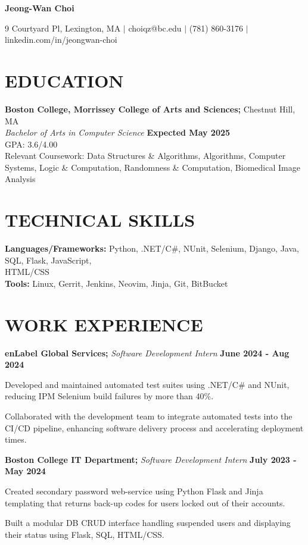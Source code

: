 \documentclass[11pt]{article}
\begin{document}
\begin{center}
\textbf{\LARGE Jeong-Wan Choi}
\end{center}

\begin{center}
9 Courtyard Pl, Lexington, MA $|$ choiqz@bc.edu $|$ (781) 860-3176 $|$ linkedin.com/in/jeongwan-choi 
\end{center}

\section*{EDUCATION}
\textbf{Boston College, Morrissey College of Arts and Sciences;} Chestnut Hill, MA \\
\textit{Bachelor of Arts in Computer Science} \hfill \textbf{Expected May 2025} \\
GPA: 3.6/4.00 \\
Relevant Coursework: Data Structures \& Algorithms, Algorithms, Computer Systems, Logic \& Computation, Randomness \& Computation, Biomedical Image Analysis 

\section*{TECHNICAL SKILLS}
\textbf{Languages/Frameworks:} Python, .NET/C\#, NUnit, Selenium, Django, Java, SQL, Flask, JavaScript, \\
HTML/CSS \\
\textbf{Tools:} Linux, Gerrit, Jenkins, Neovim, Jinja, Git, BitBucket 

\section*{WORK EXPERIENCE}
\textbf{enLabel Global Services;} \textit{Software Development Intern} \hfill \textbf{June 2024 - Aug 2024}
\begin{sublist}
	\item Developed and maintained automated test suites using .NET/C\# and NUnit, reducing IPM Selenium build failures by more than 40\%. 
	\item Collaborated with the development team to integrate automated tests into the CI/CD pipeline, enhancing software delivery process and accelerating deployment times.
\end{sublist}

\raggedright
\textbf{Boston College IT Department;} \textit{Software Development Intern} \hfill \textbf{July 2023 - May 2024}
\begin{sublist}
	\item Created secondary password web-service using Python Flask and Jinja templating that returns back-up codes for users locked out of their accounts. 
	\item Built a modular DB CRUD interface handling suspended users and displaying their status using Flask, SQL, HTML/CSS.
\end{sublist}
\end{document}
